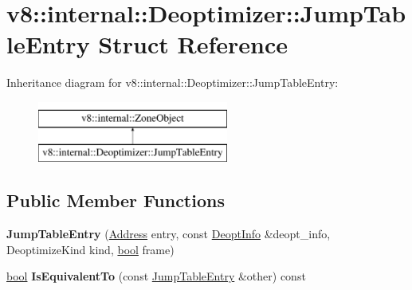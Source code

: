 \hypertarget{structv8_1_1internal_1_1Deoptimizer_1_1JumpTableEntry}{}\section{v8\+:\+:internal\+:\+:Deoptimizer\+:\+:Jump\+Table\+Entry Struct Reference}
\label{structv8_1_1internal_1_1Deoptimizer_1_1JumpTableEntry}
Inheritance diagram for v8\+:\+:internal\+:\+:Deoptimizer\+:\+:Jump\+Table\+Entry\+:\begin{figure}[H]
\begin{center}
\leavevmode
\includegraphics[height=2.000000cm]{structv8_1_1internal_1_1Deoptimizer_1_1JumpTableEntry}
\end{center}
\end{figure}
\subsection*{Public Member Functions}
\begin{DoxyCompactItemize}
\item 
\mbox{\label{structv8_1_1internal_1_1Deoptimizer_1_1JumpTableEntry_aa8b9d1739888ff5834c3570a3209156a}} 
{\bfseries Jump\+Table\+Entry} (\mbox{\hyperlink{classuintptr__t}{Address}} entry, const \mbox{\hyperlink{structv8_1_1internal_1_1Deoptimizer_1_1DeoptInfo}{Deopt\+Info}} \&deopt\+\_\+info, Deoptimize\+Kind kind, \mbox{\hyperlink{classbool}{bool}} frame)
\item 
\mbox{\label{structv8_1_1internal_1_1Deoptimizer_1_1JumpTableEntry_a307743e54055db62cedf5e4d3b4a4203}} 
\mbox{\hyperlink{classbool}{bool}} {\bfseries Is\+Equivalent\+To} (const \mbox{\hyperlink{structv8_1_1internal_1_1Deoptimizer_1_1JumpTableEntry}{Jump\+Table\+Entry}} \&other) const
\end{DoxyCompactItemize}
